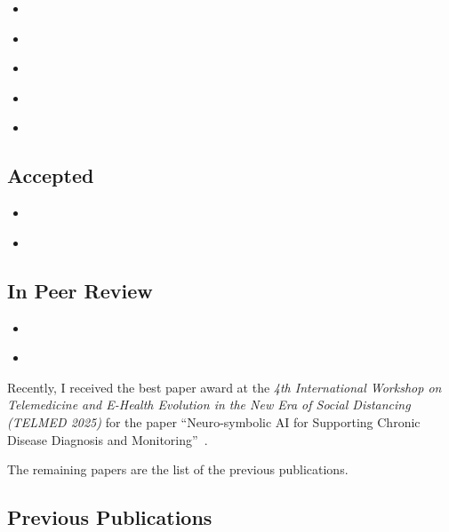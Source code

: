\documentclass[11pt]{article}
\begin{document}
\begin{itemize}
	\item {}~\cite{DBLP:conf/aime/AguzziMPVM25}
	\item {}~\cite{DBLP:journals/kbs/CiattoAMO25}
	\item {}~\cite{DBLP:conf/percom/MagniniCKSM25}
	\item {}~\cite{DBLP:conf/hc/Aguzzi24}
	\item {}~\cite{DBLP:conf/aequitas/MagniniCCO24}

\end{itemize}

\subsection{Accepted}\label{subsec:accepted}

\begin{itemize}
	\item {}~\cite{Magnini2025ActivelyLearning}
	\item {}~\cite{Matteini2025DomainSpecificNeSy}
\end{itemize}

\subsection{In Peer Review}\label{subsec:in-peer-review}

\begin{itemize}
	\item {}~\cite{Farahmand2025MedicoAI}
	\item {}~\cite{Aguzzi2025RAGSLMs}
\end{itemize}
%
Recently, I received the best paper award at the \textit{4th International Workshop on Telemedicine and E-Health Evolution in the New Era of Social Distancing (TELMED 2025)} for the paper ``Neuro-symbolic AI for Supporting Chronic Disease Diagnosis and Monitoring''~\cite{DBLP:conf/percom/MagniniCKSM25}.


The remaining papers are the list of the previous publications.
%
\subsection{Previous Publications}\label{subsec:previous-publications}
\end{document}
